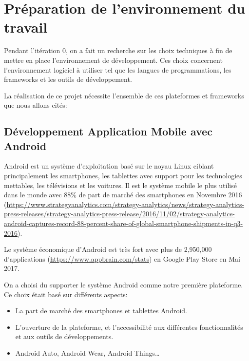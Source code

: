 \section{Préparation de l'environnement du travail}

Pendant l'itération 0, on a fait un recherche sur les choix techniques à fin de
mettre en place l'environnement de développement. Ces choix concernent
l'environnement logiciel à utiliser tel que les langues de programmations, les
frameworks et les outils de développement.


La réalisation de ce projet nécessite l'ensemble de ces plateformes et
frameworks que nous allons cités:

\subsection{Développement Application Mobile avec Android}

Android est un système d'exploitation basé sur le noyau Linux ciblant
principalement les smartphones, les tablettes avec support pour les
technologies mettables, les télévisions et les voitures. Il est le système
mobile le plus utilisé dans le monde avec 88\% de part de marché des
smartphones en Novembre 2016
(\url{https://www.strategyanalytics.com/strategy-analytics/news/strategy-analytics-press-releases/strategy-analytics-press-release/2016/11/02/strategy-analytics-android-captures-record-88-percent-share-of-global-smartphone-shipments-in-q3-2016}).

Le système économique d'Android est très fort avec plus de 2,950,000
d'applications (\url{https://www.appbrain.com/stats}) en Google Play Store en
Mai 2017.

On a choisi du supporter le système Android comme notre première plateforme. Ce
choix était basé sur différents aspects:

\begin{itemize}
    \item La part de marché des smartphones et tablettes Android.
    \item L'ouverture de la plateforme, et l'accessibilité aux différentes
        fonctionnalités et aux outils de développements.
    \item Android Auto, Android Wear, Android Things\ldots
\end{itemize}

